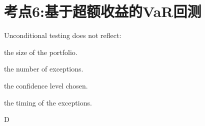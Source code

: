 \documentclass{article}
\newcounter{question} %
\begin{document}
\newpage




\section{考点6:基于超额收益的VaR回测}
\setcounter{question}{0}
\begin{question}
    Unconditional testing does not reflect:
\end{question}

\begin{choices}
    \item the size of the portfolio.
    \item the number of exceptions.
    \item the confidence level chosen.
    \item the timing of the exceptions.
\end{choices}

\begin{correctanswer}
    D
\end{correctanswer}
\end{document}
